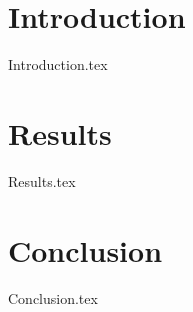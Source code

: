 \section{Introduction}
{Introduction.tex}
\section{Results}
{Results.tex}
\section{Conclusion}
{Conclusion.tex} 